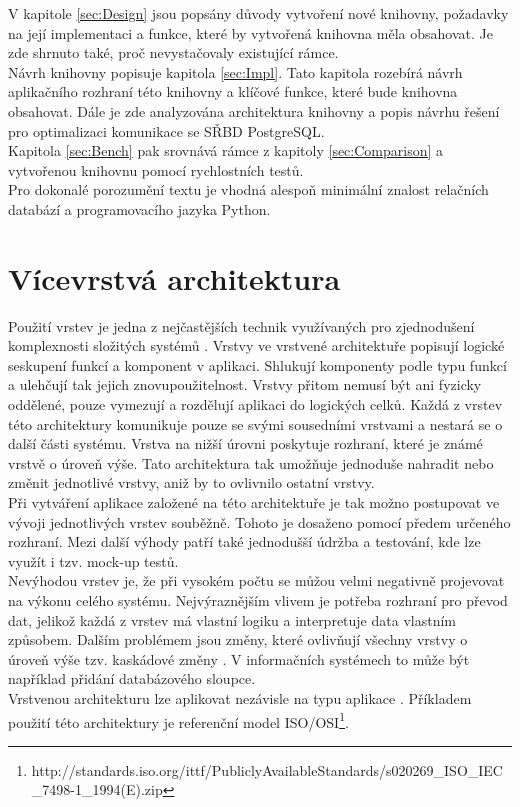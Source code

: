 \documentclass[ing,male,java,dept456]{diploma}						%
\begin{document}
V kapitole \ref{sec:Design} jsou popsány důvody vytvoření nové knihovny, požadavky na její implementaci a funkce, které by vytvořená knihovna měla obsahovat. Je zde shrnuto také, proč nevystačovaly existující rámce. \\
Návrh knihovny popisuje kapitola \ref{sec:Impl}. Tato kapitola rozebírá návrh aplikačního rozhraní této knihovny a klíčové funkce, které bude knihovna obsahovat. Dále je zde analyzována architektura knihovny a popis návrhu řešení pro optimalizaci komunikace se SŘBD PostgreSQL. \\
Kapitola \ref{sec:Bench} pak srovnává rámce z kapitoly \ref{sec:Comparison} a vytvořenou knihovnu pomocí rychlostních testů. \\
Pro dokonalé porozumění textu je vhodná alespoň minimální znalost relačních databází a programovacího jazyka Python.

\section{Vícevrstvá architektura}
\label{sec:Layers}

Použití vrstev je jedna z nejčastějších technik využívaných pro zjednodušení komplexnosti složitých systémů \cite{fowler}. Vrstvy ve vrstvené architektuře popisují logické seskupení funkcí a komponent v aplikaci. Shlukují komponenty podle typu funkcí a ulehčují tak jejich znovupoužitelnost. Vrstvy přitom nemusí být ani fyzicky oddělené, pouze vymezují a rozdělují aplikaci do logických celků. Každá z vrstev této architektury komunikuje pouze se svými sousedními vrstvami a nestará se o další části systému. Vrstva na nižší úrovni poskytuje rozhraní, které je známé vrstvě o úroveň výše. Tato architektura tak umožňuje jednoduše nahradit nebo změnit jednotlivé vrstvy, aniž by to ovlivnilo ostatní vrstvy. \\
Při vytváření aplikace založené na této architektuře je tak možno postupovat ve vývoji jednotlivých vrstev souběžně. Tohoto je dosaženo pomocí předem určeného rozhraní. Mezi další výhody patří také jednodušší údržba a testování, kde lze využít i tzv. mock-up testů. \\
Nevýhodou vrstev je, že při vysokém počtu se můžou velmi negativně projevovat na výkonu celého systému. Nejvýraznějším vlivem je potřeba rozhraní pro převod dat, jelikož každá z vrstev má vlastní logiku a interpretuje data vlastním způsobem. Dalším problémem jsou změny, které ovlivňují všechny vrstvy o úroveň výše tzv. kaskádové změny \cite{dresler}. V informačních systémech to může být například přidání databázového sloupce. \\
Vrstvenou architekturu lze aplikovat nezávisle na typu aplikace \cite{msdn}. Příkladem použití této architektury je referenční model ISO/OSI\footnote{ http://standards.iso.org/ittf/PubliclyAvailableStandards/s020269\_ISO\_IEC\_7498-1\_1994(E).zip}. \\
\end{document}
